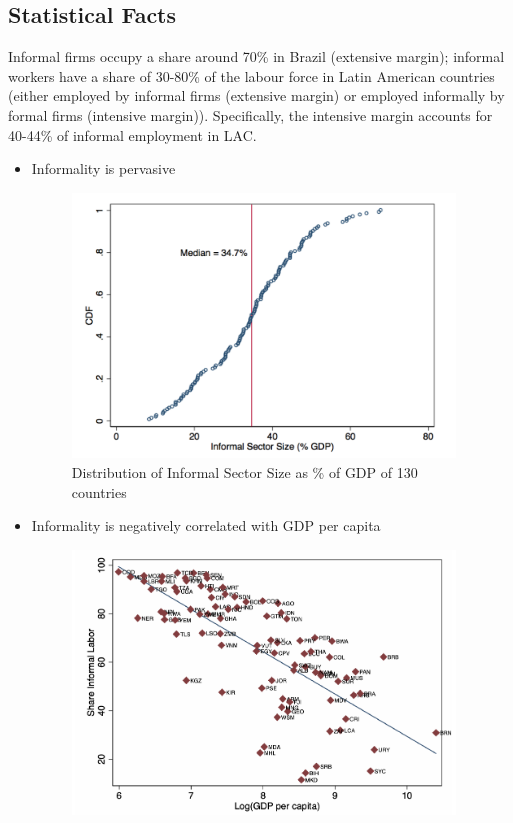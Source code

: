     \subsection{Statistical Facts}
        Informal firms occupy a share around 70\% in Brazil (extensive margin); informal workers have a share of 30-80\% of the labour force in Latin American countries (either employed by informal firms (extensive margin) or employed informally by formal firms (intensive margin)). Specifically, the intensive margin accounts for 40-44\% of informal employment in LAC.\par
        \begin{itemize}
            \item Informality is pervasive
            \begin{figure}[H]
                \centering
                \includegraphics[width=4in]{images/ch5/pervasive_informality.png}
                \caption{Distribution of Informal Sector Size as \% of GDP of 130 countries}
            \end{figure}
            \item Informality is negatively correlated with GDP per capita
            \begin{figure}[H]
                \centering
                \includegraphics[width=4in]{images/ch5/informality and gdp.png}

\end{figure}
\end{itemize}
